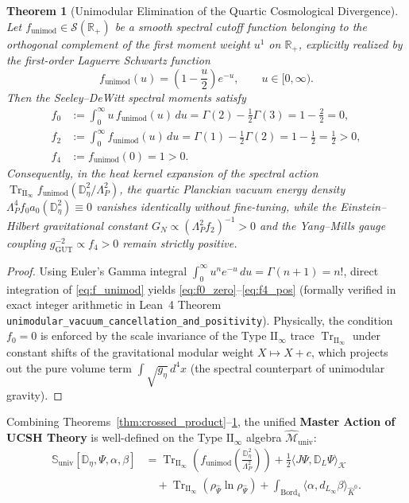 \documentclass[11pt,a4paper]{article}
\theoremstyle{plain}
\newtheorem{theorem}{Theorem}[section]
\theoremstyle{definition}
\theoremstyle{remark}
\newcommand{\TrII}{\operatorname{Tr}_{\mathrm{II}_\infty}}
\newcommand{\Bord}{\operatorname{Bord}}
\newcommand{\M}{\mathcal{M}}
\newcommand{\K}{\mathcal{K}}
\newcommand{\R}{\mathbb{R}}
\newcommand{\Dbb}{\mathbb{D}}
\newcommand{\Sbb}{\mathbb{S}}
\begin{document}
\begin{theorem}[Unimodular Elimination of the Quartic Cosmological Divergence]
\label{thm:unimodular}
Let $f_{\mathrm{unimod}} \in \mathcal{S}(\R_+)$ be a smooth spectral cutoff function belonging to the orthogonal complement of the first moment weight $u^1$ on $\R_+$, explicitly realized by the first-order Laguerre Schwartz function
\begin{equation}
  \label{eq:f_unimod}
  f_{\mathrm{unimod}}(u) = \left( 1 - \frac{u}{2} \right) e^{-u}, \qquad u \in [0, \infty).
\end{equation}
Then the Seeley--DeWitt spectral moments satisfy
\begin{align}
  f_0 &:= \int_0^\infty u \, f_{\mathrm{unimod}}(u) \, du = \Gamma(2) - \frac{1}{2}\Gamma(3) = 1 - \frac{2}{2} = 0, \label{eq:f0_zero} \\
  f_2 &:= \int_0^\infty f_{\mathrm{unimod}}(u) \, du = \Gamma(1) - \frac{1}{2}\Gamma(2) = 1 - \frac{1}{2} = \frac{1}{2} > 0, \label{eq:f2_pos} \\
  f_4 &:= f_{\mathrm{unimod}}(0) = 1 > 0. \label{eq:f4_pos}
\end{align}
Consequently, in the heat kernel expansion of the spectral action $\TrII f_{\mathrm{unimod}}(\Dbb_\eta^2 / \Lambda_P^2)$, the quartic Planckian vacuum energy density $\Lambda_P^4 f_0 a_0(\Dbb_\eta^2) \equiv 0$ vanishes identically without fine-tuning, while the Einstein--Hilbert gravitational constant $G_N \propto (\Lambda_P^2 f_2)^{-1} > 0$ and the Yang--Mills gauge coupling $g_{\mathrm{GUT}}^{-2} \propto f_4 > 0$ remain strictly positive.
\end{theorem}

\begin{proof}
Using Euler's Gamma integral $\int_0^\infty u^n e^{-u}\,du = \Gamma(n+1) = n!$, direct integration of \eqref{eq:f_unimod} yields \eqref{eq:f0_zero}--\eqref{eq:f4_pos} (formally verified in exact integer arithmetic in Lean~4 Theorem \texttt{unimodular\_\allowbreak vacuum\_\allowbreak cancellation\_\allowbreak and\_\allowbreak positivity}). Physically, the condition $f_0 = 0$ is enforced by the scale invariance of the Type $\mathrm{II}_\infty$ trace $\TrII$ under constant shifts of the gravitational modular weight $X \mapsto X + c$, which projects out the pure volume term $\int \sqrt{g_\eta}\,d^4x$ (the spectral counterpart of unimodular gravity).
\end{proof}

Combining Theorems~\ref{thm:crossed_product}--\ref{thm:unimodular}, the unified \textbf{Master Action of UCSH Theory} is well-defined on the Type $\mathrm{II}_\infty$ algebra $\widehat{\M}_{\mathrm{univ}}$:
\begin{align}
  \label{eq:master_action}
  \Sbb_{\mathrm{univ}}[\Dbb_\eta, \Psi, \alpha, \beta] &= \TrII\left( f_{\mathrm{unimod}}\left(\frac{\Dbb_\eta^2}{\Lambda_P^2}\right) \right) + \frac{1}{2} \langle J \Psi, \Dbb_L \Psi \rangle_{\K} \nonumber \\
  &\quad + \TrII\left( \rho_{\widehat{\Psi}} \ln \rho_{\widehat{\Psi}} \right) + \int_{\Bord_4} \langle \alpha, d_{L_\infty} \beta \rangle_{\widehat{K}^0}.
\end{align}
\end{document}
